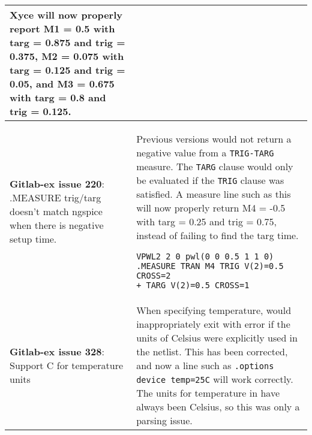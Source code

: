 {\begin{longtable}[h] {>{\raggedright\small}m{2in}|>{\raggedright\let\\\tabularnewline\small}m{3.5in}}
Xyce will now properly report M1 = 0.5 with targ = 0.875 and
trig = 0.375, M2 = 0.075 with targ = 0.125 and trig = 0.05, and
M3 = 0.675 with targ = 0.8 and trig = 0.125.
\\ \hline 

\textbf{Gitlab-ex issue 220}:  .MEASURE trig/targ doesn't match ngspice
when there is negative setup time. & Previous \Xyce{} versions would
not return a negative value from a \texttt{TRIG-TARG} measure. The 
\texttt{TARG} clause would only be evaluated if the \texttt{TRIG} clause
was satisfied.  A measure line such as this will now properly return 
M4 = -0.5 with targ = 0.25 and trig = 0.75, instead of
failing to find the targ time.

\begin{verbatim}
VPWL2 2 0 pwl(0 0 0.5 1 1 0)
.MEASURE TRAN M4 TRIG V(2)=0.5 CROSS=2
+ TARG V(2)=0.5 CROSS=1
\end{verbatim}
 \\ \hline

\textbf{Gitlab-ex issue 328}:  Support C for temperature units & 
  When specifying temperature, \Xyce{} would inappropriately exit 
  with error if the units of Celsius were explicitly used in the netlist.  
  This has been corrected, and now a line such as \texttt{.options device temp=25C} 
  will work correctly.   The units for temperature in \Xyce{} have always been 
  Celsius, so this was only a parsing issue. \\ \hline

\end{longtable}
}
